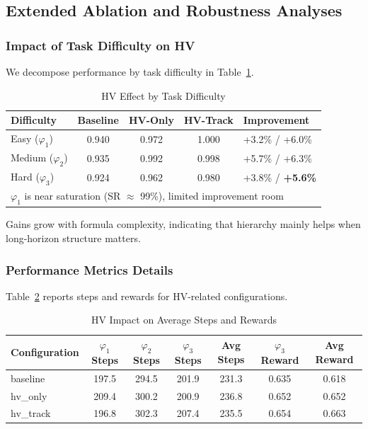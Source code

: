\documentclass[conference]{IEEEtran}
\begin{document}
\subsection{Extended Ablation and Robustness Analyses}
\label{sec:extended_ablation}
\subsubsection{Impact of Task Difficulty on HV}

We decompose performance by task difficulty in Table~\ref{tab:difficulty_impact}.

\begin{table}[t]
\centering
\caption{HV Effect by Task Difficulty}
\label{tab:difficulty_impact}
\begin{tabular}{@{}lcccl@{}}
	\toprule
	\textbf{Difficulty} & \textbf{Baseline} & \textbf{HV-Only} & \textbf{HV-Track} & \textbf{Improvement} \\ \midrule
Easy ($\varphi_1$) & 0.940 & 0.972 & 1.000 & +3.2\% / +6.0\% \\
Medium ($\varphi_2$) & 0.935 & 0.992 & 0.998 & +5.7\% / +6.3\% \\
Hard ($\varphi_3$) & 0.924 & 0.962 & 0.980 & +3.8\% / \textbf{+5.6\%} \\ \bottomrule
\multicolumn{5}{l}{\footnotesize *$\varphi_1$ is near saturation (SR $\approx$ 99\%), limited improvement room}
\end{tabular}
\end{table}

Gains grow with formula complexity, indicating that hierarchy mainly helps when long-horizon structure matters.

\subsubsection{Performance Metrics Details}

Table~\ref{tab:hv-steps-rewards} reports steps and rewards for HV-related configurations.

\begin{table}[t]
\centering
\caption{HV Impact on Average Steps and Rewards}
\label{tab:hv-steps-rewards}
\begin{tabular}{@{}lcccccc@{}}
	\toprule
	\textbf{Configuration} & \textbf{$\varphi_1$ Steps} & \textbf{$\varphi_2$ Steps} & \textbf{$\varphi_3$ Steps} & \textbf{Avg Steps} & \textbf{$\varphi_3$ Reward} & \textbf{Avg Reward} \\ \midrule
baseline & 197.5 & 294.5 & 201.9 & 231.3 & 0.635 & 0.618 \\
hv\_only & 209.4 & 300.2 & 200.9 & 236.8 & 0.652 & 0.652 \\
hv\_track & 196.8 & 302.3 & 207.4 & 235.5 & 0.654 & 0.663 \\ \bottomrule
\end{tabular}
\end{table}
\end{document}
